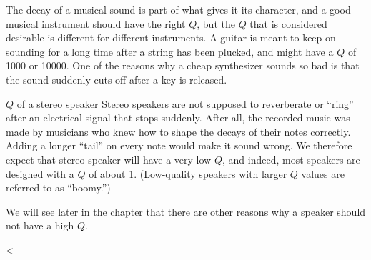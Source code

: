 The decay of a musical sound is part of what gives it its
character, and a good musical instrument should have the
right $Q$, but the $Q$ that is considered desirable is
different for different instruments. A guitar is meant to
keep on sounding for a long time after a string has been
plucked, and might have a $Q$ of 1000 or 10000. One of the
reasons why a cheap synthesizer sounds so bad is that the
sound suddenly cuts off after a key is released.

\begin{eg}{$Q$ of a stereo speaker}
Stereo speakers are not supposed to reverberate or ``ring''
after an electrical signal that stops suddenly. After all,
the recorded music was made by musicians who knew how to
shape the decays of their notes correctly. Adding a longer
``tail'' on every note would make it sound wrong. We
therefore expect that stereo speaker will have a very low
$Q$, and indeed, most speakers are designed with a $Q$ of
about 1. (Low-quality speakers with larger $Q$ values are
referred to as ``boomy.'')
\end{eg}

We will see later in the chapter that there are other
reasons why a speaker should not have a high $Q$.

<%
